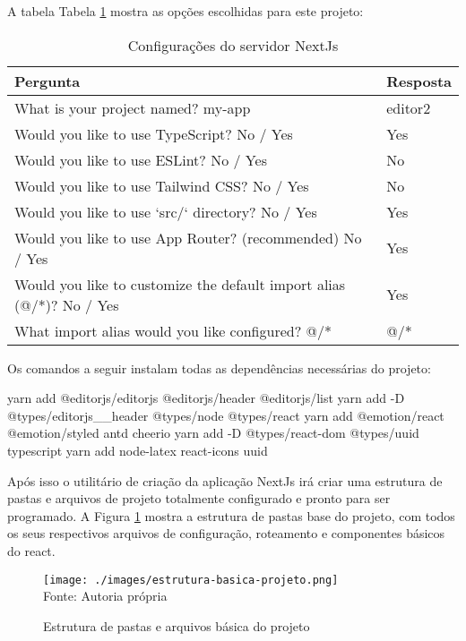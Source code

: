 A tabela
Tabela \ref{tbl:config-next-app}
mostra as opções escolhidas para este projeto:

\begin{table}[H]
    \centering
    \caption{Configurações do servidor NextJs}
    \label{tbl:config-next-app}
    \renewcommand{\arraystretch}{1.5}
    \begin{tabular}{p{13.0848cm} p{1.9552cm}}
        \hline
        \textbf{Pergunta} & \textbf{Resposta} \\
        \hline
        What is your project named? my-app & editor2 \\
		Would you like to use TypeScript? No / Yes & Yes \\
		Would you like to use ESLint? No / Yes & No \\
		Would you like to use Tailwind CSS? No / Yes & No \\
		Would you like to use `src/` directory? No / Yes & Yes \\
		Would you like to use App Router? (recommended) No / Yes & Yes \\
		Would you like to customize the default import alias (@/*)? No / Yes & Yes \\
		What import alias would you like configured? @/* & @/* \\
        \hline
        
    \end{tabular}
\end{table}

Os comandos a seguir instalam todas as dependências necessárias do projeto:

\begin{yarnAddDpts}
yarn add @editorjs/editorjs @editorjs/header @editorjs/list
yarn add -D @types/editorjs__header @types/node @types/react
yarn add @emotion/react @emotion/styled antd cheerio
yarn add -D @types/react-dom @types/uuid typescript 
yarn add node-latex react-icons uuid
\end{yarnAddDpts}

Após isso o utilitário de criação da aplicação NextJs
irá criar uma estrutura de pastas e arquivos de projeto
totalmente configurado e pronto para ser programado.
A
Figura \ref{fig:estrutura-basica-projeto}
mostra a estrutura de pastas base do projeto, com todos os seus respectivos
arquivos de configuração, roteamento e componentes básicos do react.

\begin{figure}[H]
    \centering
    \caption{Estrutura de pastas e arquivos básica do projeto}
    \texttt{[image: ./images/estrutura-basica-projeto.png]}
    \label{fig:estrutura-basica-projeto} \\
    \textnormal{\fontsize{10pt}{12pt}Fonte: Autoria própria}
\end{figure}

